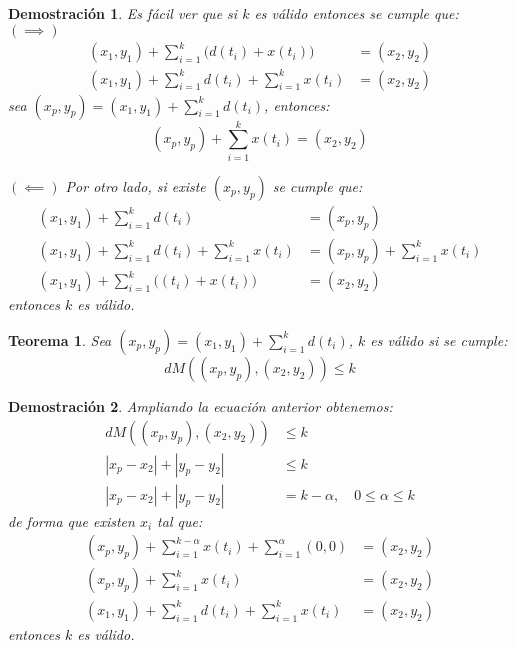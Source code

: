 \documentclass{article}
\theoremstyle{default}
\newtheorem{theorem}{Teorema}
\newtheorem*{demonstration}{Demostración}
\begin{document}
	\begin{demonstration}
		Es fácil ver que si $k$ es válido entonces se cumple que:
		\\

		$(\implies)$\vspace*{-27pt}
		\begin{align*}
			(x_1,y_1) + \sum\limits_{i=1}^{k} { \Big( d(t_i) + x(t_i) \Big)} &= (x_2, y_2) \\
			(x_1,y_1) + \sum\limits_{i=1}^{k}{d(t_i)} + \sum\limits_{i=1}^{k}{x(t_i)} &= (x_2, y_2)
		\end{align*}
		sea $(x_p, y_p) = (x_1, y_1) + \sum\limits_{i=1}^{k}{d(t_i)}$, entonces:
		\begin{equation*}
			(x_p,y_p) + \sum\limits_{i=1}^{k}{x(t_i)} = (x_2, y_2)
		\end{equation*}

		$(\impliedby)$ Por otro lado, si existe $(x_p, y_p)$ se cumple que:
		\begin{align*}
			(x_1,y_1) + \sum\limits_{i=1}^{k}{d(t_i)}
				&= (x_p, y_p)\\
			(x_1,y_1) + \sum\limits_{i=1}^{k}{d(t_i)} + \sum\limits_{i=1}^{k}{x(t_i)}
				&= (x_p,y_p) + \sum\limits_{i=1}^{k}{x(t_i)}\\
			(x_1,y_1) + \sum\limits_{i=1}^{k}{\Big((t_i) + x(t_i)\Big)}
				&= (x_2,y_2)
		\end{align*}
		entonces $k$ es válido.
	\end{demonstration}
%
	\begin{theorem}\label{thm:valid-k}
		Sea $(x_p,y_p) = (x_1,y_1) + \sum\limits_{i=1}^k{d(t_i)}$, $k$ es válido si se cumple:
		\begin{equation*}
			dM((x_p,y_p), (x_2,y_2)) \leq k
		\end{equation*}
	\end{theorem}
	\begin{demonstration}
		Ampliando la ecuación anterior obtenemos:
		\begin{align*}
			dM((x_p,y_p), (x_2,y_2)) &\leq k \\
			|x_p - x_2| + |y_p - y_2| &\leq k \\
			|x_p - x_2| + |y_p - y_2| &= k - \alpha	,\quad 0 \leq \alpha \leq k
		\end{align*}
		de forma que existen $x_i$ tal que:
		\begin{align*}
			(x_p, y_p) + \sum\limits_{i=1}^{k-\alpha}{x(t_i)}
					   + \sum\limits_{i=1}^{\alpha}{(0,0)}
					   &= (x_2, y_2)
			\\
			(x_p, y_p) + \sum\limits_{i=1}^{k}{x(t_i)}
					   &= (x_2, y_2)
			\\
			(x_1,y_1) + \sum\limits_{i=1}^k{d(t_i)}
					  + \sum\limits_{i=1}^{k}{x(t_i)}
					   &= (x_2, y_2)
		\end{align*}
		entonces $k$ es válido.
	\end{demonstration}
%
\end{document}
